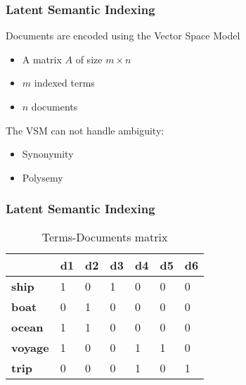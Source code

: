 \begin{frame}[plain]
  \frametitle{Latent Semantic Indexing}
  \begin{block}{}
  Documents are encoded using the Vector Space Model 
  \begin{itemize}
    \item A matrix $A$ of size $m \times n$
    \item $m$ indexed terms
    \item $n$ documents
  \end{itemize}
  \end{block} 

  \begin{block}{}
    The VSM can not handle ambiguity:
    \begin{itemize}
    \item Synonymity
    \item Polysemy
    \end{itemize}
  \end{block} 
\end{frame}
	\begin{frame}[plain]
	 	\frametitle{Latent Semantic Indexing}
		\begin{block}{}
\begin{table}[]
\centering
\begin{tabular}{|l|l|l|l|l|l|l|}
\hline
             & {\bf d1} & {\bf d2} & {\bf d3} & {\bf d4} & {\bf d5} & {\bf d6} \\ \hline
{\bf ship}   & 1        & 0        & 1        & 0        & 0        & 0        \\ \hline
{\bf boat}   & 0        & 1        & 0        & 0        & 0        & 0        \\ \hline
{\bf ocean}  & 1        & 1        & 0        & 0        & 0        & 0        \\ \hline
{\bf voyage} & 1        & 0        & 0        & 1        & 1        & 0        \\ \hline
{\bf trip}   & 0        & 0        & 0        & 1        & 0        & 1        \\ \hline
\end{tabular}
\caption{Terms-Documents matrix }
\label{table:example00}
\end{table}
		\end{block} 
	\end{frame}
